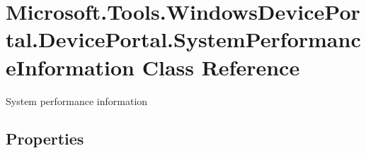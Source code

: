 \hypertarget{class_microsoft_1_1_tools_1_1_windows_device_portal_1_1_device_portal_1_1_system_performance_information}{}\section{Microsoft.\+Tools.\+Windows\+Device\+Portal.\+Device\+Portal.\+System\+Performance\+Information Class Reference}
\label{class_microsoft_1_1_tools_1_1_windows_device_portal_1_1_device_portal_1_1_system_performance_information}


System performance information  


\subsection*{Properties}
